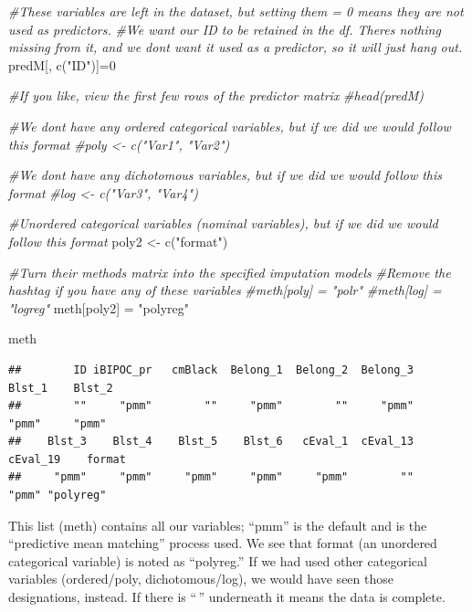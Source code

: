 \documentclass[
]{book}
\newenvironment{Shaded}{\begin{snugshade}}{\end{snugshade}}
\newcommand{\CommentTok}[1]{\textcolor[rgb]{0.56,0.35,0.01}{\textit{#1}}}
\newcommand{\DecValTok}[1]{\textcolor[rgb]{0.00,0.00,0.81}{#1}}
\newcommand{\FunctionTok}[1]{\textcolor[rgb]{0.00,0.00,0.00}{#1}}
\newcommand{\NormalTok}[1]{#1}
\newcommand{\OtherTok}[1]{\textcolor[rgb]{0.56,0.35,0.01}{#1}}
\newcommand{\StringTok}[1]{\textcolor[rgb]{0.31,0.60,0.02}{#1}}
\begin{document}
\begin{Shaded}
\begin{Highlighting}[]
\CommentTok{\#These variables are left in the dataset, but setting them = 0 means they are not used as predictors.  }
\CommentTok{\#We want our ID to be retained in the df.  There\textquotesingle{}s nothing missing from it, and we don\textquotesingle{}t want it used as a predictor, so it will just hang out.}
\NormalTok{predM[, }\FunctionTok{c}\NormalTok{(}\StringTok{"ID"}\NormalTok{)]}\OtherTok{=}\DecValTok{0}

\CommentTok{\#If you like, view the first few rows of the predictor matrix}
\CommentTok{\#head(predM)}

\CommentTok{\#We don\textquotesingle{}t have any ordered categorical variables, but if we did we would follow this format}
\CommentTok{\#poly \textless{}{-} c("Var1", "Var2")}

\CommentTok{\#We don\textquotesingle{}t have any dichotomous variables, but if we did we would follow this format}
\CommentTok{\#log \textless{}{-} c("Var3", "Var4")}

\CommentTok{\#Unordered categorical variables (nominal variables), but if we did we would follow this format}
\NormalTok{poly2 }\OtherTok{\textless{}{-}} \FunctionTok{c}\NormalTok{(}\StringTok{"format"}\NormalTok{)}

\CommentTok{\#Turn their methods matrix into the specified imputation models}
\CommentTok{\#Remove the hashtag if you have any of these variables}
\CommentTok{\#meth[poly] = "polr" }
\CommentTok{\#meth[log] = "logreg"}
\NormalTok{meth[poly2] }\OtherTok{=} \StringTok{"polyreg"}

\NormalTok{meth}
\end{Highlighting}
\end{Shaded}

\begin{verbatim}
##        ID iBIPOC_pr   cmBlack  Belong_1  Belong_2  Belong_3    Blst_1    Blst_2 
##        ""     "pmm"        ""     "pmm"        ""     "pmm"     "pmm"     "pmm" 
##    Blst_3    Blst_4    Blst_5    Blst_6   cEval_1  cEval_13  cEval_19    format 
##     "pmm"     "pmm"     "pmm"     "pmm"     "pmm"        ""     "pmm" "polyreg"
\end{verbatim}

This list (meth) contains all our variables; ``pmm'' is the default and is the ``predictive mean matching'' process used. We see that format (an unordered categorical variable) is noted as ``polyreg.'' If we had used other categorical variables (ordered/poly, dichotomous/log), we would have seen those designations, instead. If there is ``\,'' underneath it means the data is complete.
\end{document}
